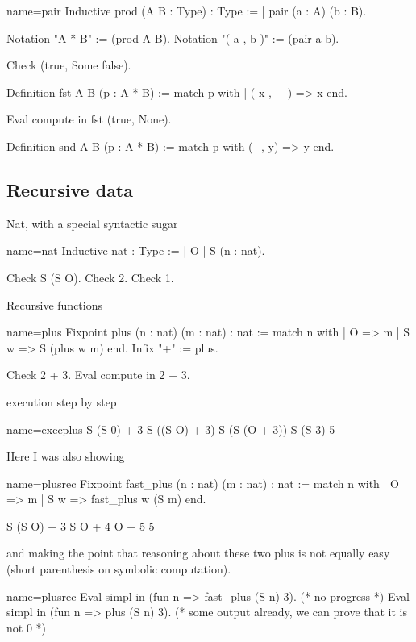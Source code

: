 \begin{coq}{name=pair}{}
 Inductive prod (A B : Type) : Type :=
 | pair (a : A) (b : B).

 Notation "A * B" := (prod A B).
 Notation "( a , b )" := (pair a b).

Check (true, Some false).

Definition fst A B (p : A * B) :=
  match p with
  | ( x , _ ) => x
  end.

Eval compute in fst (true, None).

Definition snd A B (p : A * B) :=
  match p with (_, y) => y end.
\end{coq}

\subsection{Recursive data}

Nat, with a special syntactic sugar

\begin{coq}{name=nat}{}
   Inductive nat : Type :=
   | O
   | S (n : nat).

Check S (S O).
Check 2.
Check 1.
\end{coq}

Recursive functions

\begin{coq}{name=plus}{}
Fixpoint plus (n : nat) (m : nat) : nat :=
  match n with
  | O => m
  | S w => S (plus w m)
  end.
Infix "+" := plus.

Check 2 + 3.
Eval compute in 2 + 3.
\end{coq}

execution step by step

\begin{coq}{name=execplus}{}
   S (S 0) + 3
   S ((S O) + 3)
   S (S (O + 3))
   S (S 3)
   5
\end{coq}

Here I was also showing

\begin{coq}{name=plusrec}{}
Fixpoint fast_plus (n : nat) (m : nat) : nat :=
  match n with
  | O => m
  | S w => fast_plus w (S m)
  end.

    S (S O) + 3
    S O + 4
    O + 5
    5
\end{coq}

and making the point that reasoning about these two plus is not equally easy (short parenthesis on symbolic computation).

\begin{coq}{name=plusrec}{}
Eval simpl in
  (fun n => fast_plus (S n) 3).  (* no progress *)
Eval simpl in
  (fun n => plus (S n) 3).  (* some output already, we can prove that it is not 0 *)
\end{coq}

